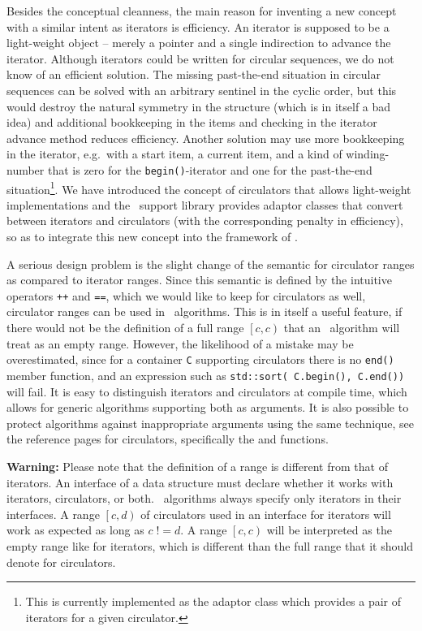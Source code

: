 Besides the conceptual cleanness, the main reason for inventing a new
concept with a similar intent as iterators is efficiency. An iterator
is supposed to be a light-weight object -- merely a pointer and a
single indirection to advance the iterator.  Although iterators could
be written for circular sequences, we do not know of an efficient
solution. The missing past-the-end situation in circular sequences can
be solved with an arbitrary sentinel in the cyclic order, but this
would destroy the natural symmetry in the structure (which is in
itself a bad idea) and additional bookkeeping in the items and
checking in the iterator advance method reduces efficiency.  Another
solution may use more bookkeeping in the iterator, e.g.~with a start
item, a current item, and a kind of winding-number that is zero for
the {\tt begin()}-iterator and one for the past-the-end
situation\footnote{This is currently implemented as the
  adaptor class which provides a pair of iterators for a given
  circulator.}.  We have introduced the concept of circulators
that allows light-weight implementations and the \cgal\ support
library provides adaptor classes that convert between iterators and
circulators (with the corresponding penalty in efficiency), so as to
integrate this new concept into the framework of \stl.

A serious design problem is the slight change of the semantic for
circulator ranges as compared to iterator ranges. Since this semantic
is defined by the intuitive operators {\tt ++} and {\tt ==}, which we
would like to keep for circulators as well, circulator ranges can be
used in \stl\ algorithms. This is in itself a useful feature, if there
would not be the definition of a full range $\left[c, c\right)$ that
an \stl\ algorithm will treat as an empty range. However, the
likelihood of a mistake may be overestimated, since for a container
{\tt C} supporting circulators there is no {\tt end()} member
function, and an expression such as {\tt std::sort( C.begin(),
  C.end())} will fail.  It is easy to distinguish iterators and
circulators at compile time, which allows for generic algorithms
supporting both as arguments.  It is also possible to protect
algorithms against inappropriate arguments using the same technique,
see the reference pages for circulators, specifically the
 and  functions.

{\bf Warning:} Please note that the definition of a range is different
from that of iterators. An interface of a data structure must declare
whether it works with iterators, circulators, or both. \stl\ 
algorithms always specify only iterators in their interfaces. A range
$\left[c, d\right)$ of circulators used in an interface for iterators
will work as expected as long as $c\; !\!= d$. A range $\left[c,
  c\right)$ will be interpreted as the empty range like for iterators,
which is different than the full range that it should denote for
circulators.

